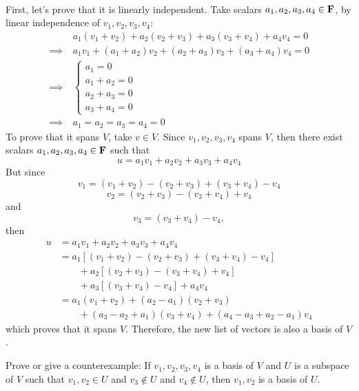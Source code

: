 \begin{solution}
    \\ First, let's prove that it is linearly independent. Take scalars $a_1, a_2, a_3, a_4 \in \mathbf{F}$, by linear independence of $v_1, v_2, v_3, v_4$:
    \begin{align*}
        &a_1(v_1 + v_2) + a_2(v_2 + v_3) + a_3(v_3 + v_4) + a_4v_4 = 0 \\
        \implies \ & a_1v_1 + (a_1 + a_2)v_2 + (a_2 + a_3)v_3 + (a_3 + a_4)v_4 = 0 \\
        \implies \ & \begin{cases}
            a_1 = 0 \\ a_1 + a_2 = 0 \\ a_2 + a_3 = 0 \\ a_3 + a_4 = 0
        \end{cases}\\
        \implies \ & a_1 = a_2 = a_3 = a_4 = 0
    \end{align*}
    To prove that it spans $V$, take $v \in V$. Since $v_1, v_2, v_3, v_4$ spans $V$, then there exist scalars $a_1, a_2, a_3, a_4 \in \mathbf{F}$ such that
    $$u = a_1v_1 + a_2 v_2 + a_3 v_3 + a_4 v_4$$
    But since
    $$v_1 = (v_1 + v_2) - (v_2 + v_3) + (v_3 + v_4) - v_4$$
    $$v_2 = (v_2 + v_3) - (v_3 + v_4) + v_4$$
    and 
    $$v_3 = (v_3 + v_4) - v_4,$$
    then
    \begin{align*}
        u &=  a_1v_1 + a_2 v_2 + a_3 v_3 + a_4 v_4 \\
        &= a_1[(v_1 + v_2) - (v_2 + v_3) + (v_3 + v_4) - v_4] \\ & \qquad + a_2[(v_2 + v_3) - (v_3 + v_4) + v_4] \\ & \qquad + a_3[ (v_3 + v_4) - v_4] + a_4v_4\\
        &= a_1(v_1 + v_2) + (a_2 - a_1)(v_2 + v_3) \\ & \qquad + (a_3 - a_2 + a_1)(v_3 + v_4) + (a_4 - a_3 + a_2 - a_1)v_4
    \end{align*}
    which proves that it spans $V$. Therefore, the new list of vectors is also a basis of $V$. \\
\end{solution}

\begin{exercise}
    Prove or give a counterexample: If $v_1, v_2, v_3, v_4$ is a basis of $V$ and $U$ is a subspace of $V$ such that $v_1, v_2 \in U$ and $v_3 \notin U$ and $v_4 \notin U$, then $v_1, v_2$ is a basis of $U$. \\
\end{exercise}

